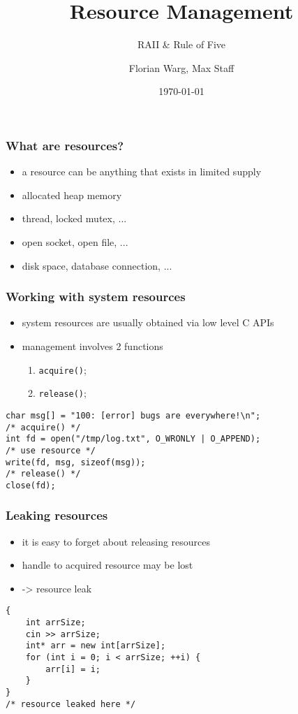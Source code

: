 
\usepackage{colortbl}



\title{Resource Management}
\subtitle{RAII \& Rule of Five}
\date{\today}
\author{Florian Warg, Max Staff}

\maketitle

\begin{frame}[fragile]
    \frametitle{What are resources?}
    \begin{itemize}
    \item a resource can be anything that exists in limited supply
    \item allocated heap memory
    \item thread, locked mutex, ...
    \item open socket, open file, ...
    \item disk space, database connection, ...
    \end{itemize}
\end{frame}

\begin{frame}[fragile]
    \frametitle{Working with system resources}
    \begin{itemize}
        \item system resources are usually obtained via low level C APIs
        \item management involves 2 functions
        \begin{enumerate}
            \item \lstinline{acquire()};
            \item \lstinline{release()};
        \end{enumerate}
    \end{itemize}
    \begin{lstlisting}[numbers=none]
char msg[] = "100: [error] bugs are everywhere!\n";
/* acquire() */
int fd = open("/tmp/log.txt", O_WRONLY | O_APPEND);
/* use resource */
write(fd, msg, sizeof(msg));
/* release() */
close(fd);
    \end{lstlisting}
\end{frame}


\begin{frame}[fragile]
    \frametitle{Leaking resources}
    \begin{itemize}
        \item it is easy to forget about releasing resources
        \item handle to acquired resource may be lost
        \item -> resource leak
    \end{itemize}
    \begin{lstlisting}[numbers=none]
{
    int arrSize;
    cin >> arrSize;
    int* arr = new int[arrSize];
    for (int i = 0; i < arrSize; ++i) {
        arr[i] = i;
    }
}
/* resource leaked here */
    \end{lstlisting}
\end{frame}


